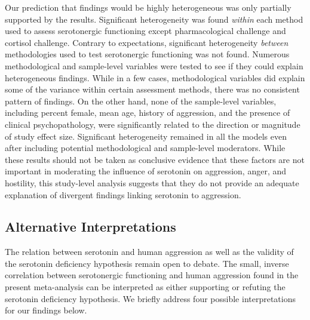 Our prediction that findings would be highly heterogeneous was only partially supported by the results. Significant heterogeneity was found \emph{within} each method used to assess serotonergic functioning except pharmacological challenge and cortisol challenge. Contrary to expectations, significant heterogeneity \emph{between} methodologies used to test serotonergic functioning was not found. Numerous methodological and sample-level variables were tested to see if they could explain heterogeneous findings. While in a few cases, methodological variables did explain some of the variance within certain assessment methods, there was no consistent pattern of findings. On the other hand, none of the sample-level variables, including percent female, mean age, history of aggression, and the presence of clinical psychopathology, were significantly related to the direction or magnitude of study effect size. Significant heterogeneity remained in all the models even after including potential methodological and sample-level moderators. While these results should not be taken as conclusive evidence that these factors are not important in moderating the influence of serotonin on aggression, anger, and hostility, this study-level analysis suggests that they do not provide an adequate explanation of divergent findings linking serotonin to aggression.


\subsection{Alternative Interpretations}
The relation between serotonin and human aggression as well as the validity of the serotonin deficiency hypothesis remain open to debate. The small, inverse correlation between serotonergic functioning and human aggression found in the present meta-analysis can be interpreted as either supporting or refuting the serotonin deficiency hypothesis. We briefly address four possible interpretations for our findings below. 


